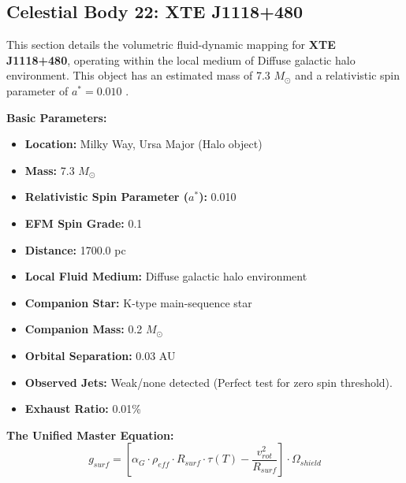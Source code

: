 \documentclass[11pt, a4paper]{article}
\begin{document}
\clearpage
\subsection{Celestial Body 22: XTE J1118+480}
This section details the volumetric fluid-dynamic mapping for \textbf{XTE J1118+480}, operating within the local medium of Diffuse galactic halo environment. This object has an estimated mass of 7.3 $M_{\odot}$ and a relativistic spin parameter of $a^* = 0.010$ \cite{khargharia2013, simbad}.

\vspace{0.5em}
\noindent \textbf{Basic Parameters:}
\begin{itemize}
  \item \textbf{Location:} Milky Way, Ursa Major (Halo object)
  \item \textbf{Mass:} 7.3 $M_{\odot}$
  \item \textbf{Relativistic Spin Parameter ($a^*$):} 0.010
  \item \textbf{EFM Spin Grade:} 0.1
  \item \textbf{Distance:} 1700.0 pc
  \item \textbf{Local Fluid Medium:} Diffuse galactic halo environment
  \item \textbf{Companion Star:} K-type main-sequence star
  \item \textbf{Companion Mass:} 0.2 $M_{\odot}$
  \item \textbf{Orbital Separation:} 0.03 AU
  \item \textbf{Observed Jets:} Weak/none detected (Perfect test for zero spin threshold).
  \item \textbf{Exhaust Ratio:} 0.01\%
\end{itemize}

\vspace{0.5em}
\noindent \textbf{The Unified Master Equation:}
$$ g_{surf} = \left[ \alpha_G \cdot \rho_{eff} \cdot R_{surf} \cdot \tau(T) - \frac{v_{rot}^2}{R_{surf}} \right] \cdot \Omega_{shield} $$
\end{document}
